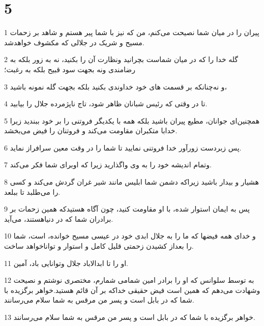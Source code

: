 \chapter{5}

\par 1 پیران را در میان شما نصیحت می‌کنم، من که نیز با شما پیر هستم و شاهد بر زحمات مسیح و شریک در جلالی که مکشوف خواهدشد.
\par 2 گله خدا را که در میان شماست بچرانید ونظارت آن را بکنید، نه به زور بلکه به رضامندی ونه بجهت سود قبیح بلکه به رغبت؛
\par 3 و نه‌چنانکه بر قسمت های خود خداوندی بکنید بلکه بجهت گله نمونه باشید،
\par 4 تا در وقتی که رئیس شبانان ظاهر شود، تاج ناپژمرده جلال را بیابید.
\par 5 همچنین‌ای جوانان، مطیع پیران باشید بلکه همه با یکدیگر فروتنی را بر خود ببندید زیرا خدابا متکبران مقاومت می‌کند و فروتنان را فیض می‌بخشد.
\par 6 پس زبردست زورآور خدا فروتنی نمایید تا شما را در وقت معین سرافراز نماید.
\par 7 وتمام اندیشه خود را به وی واگذارید زیرا که اوبرای شما فکر می‌کند.
\par 8 هشیار و بیدار باشید زیراکه دشمن شما ابلیس مانند شیر غران گردش می‌کند و کسی را می‌طلبد تا ببلعد.
\par 9 پس به ایمان استوار شده، با او مقاومت کنید، چون آگاه هستیدکه همین زحمات بر برادران شما که در دنیاهستند، می‌آید.
\par 10 و خدای همه فیضها که ما را به جلال ابدی خود در عیسی مسیح خوانده، است، شما را بعداز کشیدن زحمتی قلیل کامل و استوار و تواناخواهد ساخت.
\par 11 او را تا ابدالاباد جلال وتوانایی باد، آمین.
\par 12 به توسط سلوانس که او را برادر امین شمامی شمارم، مختصری نوشتم و نصیحت وشهادت می‌دهم که همین است فیض حقیقی خداکه بر آن قائم هستید.خواهر برگزیده با شما که در بابل است و پسر من مرقس به شما سلام می‌رسانند.
\par 13 خواهر برگزیده با شما که در بابل است و پسر من مرقس به شما سلام می‌رسانند.



